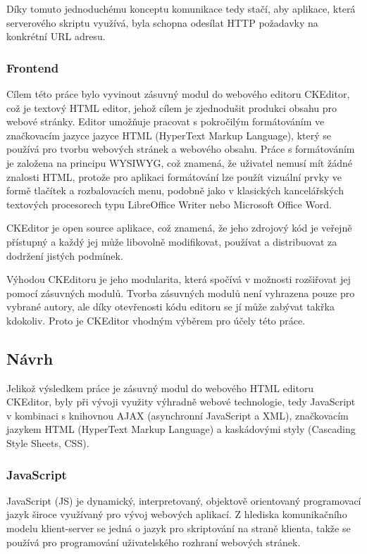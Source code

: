 \documentclass{article}
\begin{document}
Díky tomuto jednoduchému konceptu komunikace tedy stačí, aby aplikace, která serverového skriptu využívá, byla schopna odesílat HTTP požadavky na konkrétní URL adresu. 

\subsubsection{Frontend}

Cílem této práce bylo vyvinout zásuvný modul do webového editoru CKEditor, což je textový HTML editor, jehož cílem je zjednodušit produkci obsahu pro webové stránky. Editor umožňuje pracovat s pokročilým formátováním ve značkovacím jazyce jazyce HTML (HyperText Markup Language), který se používá pro tvorbu webových stránek a webového obsahu. Práce s formátováním je založena na principu WYSIWYG, což znamená, že uživatel nemusí mít žádné znalosti HTML, protože pro aplikaci formátování lze použít vizuální prvky ve formě tlačítek a rozbalovacích menu, podobně jako v klasických kancelářských textových procesorech typu LibreOffice Writer nebo Microsoft Office Word.

CKEditor je open source aplikace, což znamená, že jeho zdrojový kód je veřejně přístupný a každý jej může libovolně modifikovat, používat a distribuovat za dodržení jistých podmínek. 

Výhodou CKEditoru je jeho modularita, která spočívá v možnosti rozšiřovat jej pomocí zásuvných modulů. Tvorba zásuvných modulů není vyhrazena pouze pro vybrané autory, ale  díky otevřenosti kódu editoru se jí může zabývat takřka kdokoliv. Proto je CKEditor vhodným výběrem pro účely této práce. %

\subsection{Návrh}

Jelikož výsledkem práce je zásuvný modul do webového HTML editoru CKEditor, byly při vývoji využity výhradně webové technologie, tedy JavaScript v kombinaci s knihovnou AJAX (asynchronní JavaScript a XML), značkovacím jazykem HTML (HyperText Markup Language) a kaskádovými styly (Cascading Style Sheets, CSS). 

\subsubsection{JavaScript}

JavaScript (JS) je dynamický, interpretovaný, objektově orientovaný programovací jazyk široce využívaný pro vývoj webových aplikací. Z hlediska komunikačního modelu klient-server se jedná o jazyk pro skriptování na straně klienta, takže se používá pro programování uživatelského rozhraní webových stránek. %
\end{document}
